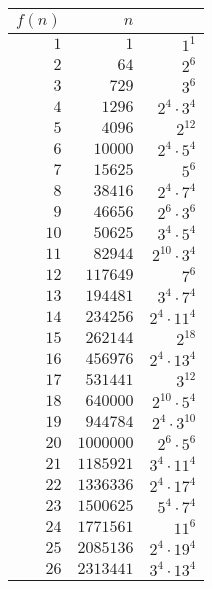 \begin{center}
\begin{tabular} {|rr|r}
$f(n)$ & $n$ &  \\ \hline
  $1$ &        $1$ &                      $1^{1}$ \\
  $2$ &       $64$ &                      $2^{6}$ \\
  $3$ &      $729$ &                      $3^{6}$ \\
  $4$ &     $1296$ &            $2^{4}\cdot3^{4}$ \\
  $5$ &     $4096$ &                     $2^{12}$ \\
  $6$ &    $10000$ &            $2^{4}\cdot5^{4}$ \\
  $7$ &    $15625$ &                      $5^{6}$ \\
  $8$ &    $38416$ &            $2^{4}\cdot7^{4}$ \\
  $9$ &    $46656$ &            $2^{6}\cdot3^{6}$ \\
 $10$ &    $50625$ &            $3^{4}\cdot5^{4}$ \\
 $11$ &    $82944$ &           $2^{10}\cdot3^{4}$ \\
 $12$ &   $117649$ &                      $7^{6}$ \\
 $13$ &   $194481$ &            $3^{4}\cdot7^{4}$ \\
 $14$ &   $234256$ &           $2^{4}\cdot11^{4}$ \\
 $15$ &   $262144$ &                     $2^{18}$ \\
 $16$ &   $456976$ &           $2^{4}\cdot13^{4}$ \\
 $17$ &   $531441$ &                     $3^{12}$ \\
 $18$ &   $640000$ &           $2^{10}\cdot5^{4}$ \\
 $19$ &   $944784$ &           $2^{4}\cdot3^{10}$ \\
 $20$ &  $1000000$ &            $2^{6}\cdot5^{6}$ \\
 $21$ &  $1185921$ &           $3^{4}\cdot11^{4}$ \\
 $22$ &  $1336336$ &           $2^{4}\cdot17^{4}$ \\
 $23$ &  $1500625$ &            $5^{4}\cdot7^{4}$ \\
 $24$ &  $1771561$ &                     $11^{6}$ \\
 $25$ &  $2085136$ &           $2^{4}\cdot19^{4}$ \\
 $26$ &  $2313441$ &           $3^{4}\cdot13^{4}$ \\

\end{tabular}
\end{center}
